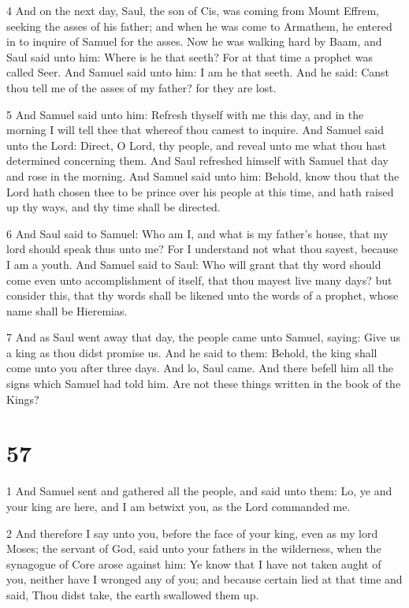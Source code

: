 \par 4 And on the next day, Saul, the son of Cis, was coming from Mount Effrem, seeking the asses of his father; and when he was come to Armathem, he entered in to inquire of Samuel for the asses. Now he was walking hard by Baam, and Saul said unto him: Where is he that seeth? For at that time a prophet was called Seer. And Samuel said unto him: I am he that seeth. And he said: Canst thou tell me of the asses of my father? for they are lost. 

\par 5 And Samuel said unto him: Refresh thyself with me this day, and in the morning I will tell thee that whereof thou camest to inquire. And Samuel said unto the Lord: Direct, O Lord, thy people, and reveal unto me what thou hast determined concerning them. And Saul refreshed himself with Samuel that day and rose in the morning. And Samuel said unto him: Behold, know thou that the Lord hath chosen thee to be prince over his people at this time, and hath raised up thy ways, and thy time shall be directed. 

\par 6 And Saul said to Samuel: Who am I, and what is my father's house, that my lord should speak thus unto me? For I understand not what thou sayest, because I am a youth. And Samuel said to Saul: Who will grant that thy word should come even unto accomplishment of itself, that thou mayest live many days? but consider this, that thy words shall be likened unto the words of a prophet, whose name shall be Hieremias. 

\par 7 And as Saul went away that day, the people came unto Samuel, saying: Give us a king as thou didst promise us. And he said to them: Behold, the king shall come unto you after three days. And lo, Saul came. And there befell him all the signs which Samuel had told him. Are not these things written in the book of the Kings?

\chapter{57}

\par 1 And Samuel sent and gathered all the people, and said unto them: Lo, ye and your king are here, and I am betwixt you, as the Lord commanded me. 

\par 2 And therefore I say unto you, before the face of your king, even as my lord Moses; the servant of God, said unto your fathers in the wilderness, when the synagogue of Core arose against him: Ye know that I have not taken aught of you, neither have I wronged any of you; and because certain lied at that time and said, Thou didst take, the earth swallowed them up. 

